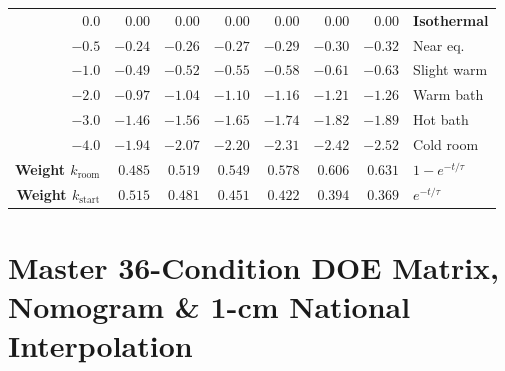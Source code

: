 \begin{twocol}[0.48]
\begin{tabularx}{\linewidth}{@{}r|rrrrrr>{\raggedright\arraybackslash}X@{}}
\rowcolor{rowalt}$\mathbf{0.0}$ & $\mathbf{0.00}$ & $\mathbf{0.00}$ & $\mathbf{0.00}$ & $\mathbf{0.00}$ & $\mathbf{0.00}$ & $\mathbf{0.00}$ & \textbf{Isothermal} \\
$\mathbf{-0.5}$ & $-0.24$ & $-0.26$ & $-0.27$ & $-0.29$ & $-0.30$ & $-0.32$ & Near eq. \\
\rowcolor{rowalt}$\mathbf{-1.0}$ & $-0.49$ & $-0.52$ & $-0.55$ & $-0.58$ & $-0.61$ & $-0.63$ & Slight warm \\
$\mathbf{-2.0}$ & $-0.97$ & $-1.04$ & $-1.10$ & $-1.16$ & $-1.21$ & $-1.26$ & Warm bath \\
\rowcolor{rowalt}$\mathbf{-3.0}$ & $-1.46$ & $-1.56$ & $-1.65$ & $-1.74$ & $-1.82$ & $-1.89$ & Hot bath \\
$\mathbf{-4.0}$ & $-1.94$ & $-2.07$ & $-2.20$ & $-2.31$ & $-2.42$ & $-2.52$ & Cold room \\
\midrule
\textbf{Weight $k_{\mathrm{room}}$} & $0.485$ & $0.519$ & $0.549$ & $0.578$ & $0.606$ & $0.631$ & $1-e^{-t/\tau}$ \\
\rowcolor{rowalt}\textbf{Weight $k_{\mathrm{start}}$} & $0.515$ & $0.481$ & $0.451$ & $0.422$ & $0.394$ & $0.369$ & $e^{-t/\tau}$ \\
\bottomrule
\end{tabularx}
\end{twocol}

\section{Master 36-Condition DOE Matrix, Nomogram \& 1-cm National Interpolation}\label{sec:16.3}

